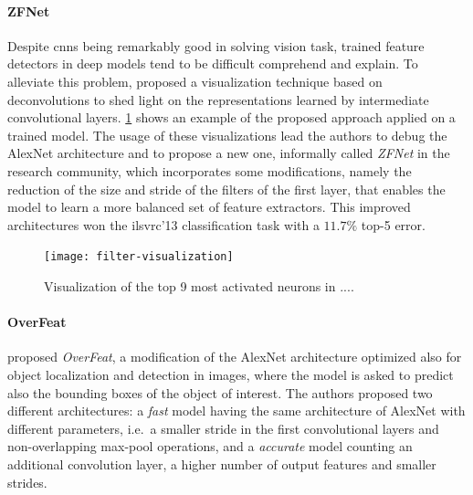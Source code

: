 \paragraph{ZFNet} Despite \glspl{cnn} being remarkably good in solving vision task,
trained feature detectors in deep models tend to be difficult comprehend and explain.
To alleviate this problem, \citet{zeiler2014visualizing} proposed a visualization technique based on deconvolutions to shed light on the representations learned by intermediate convolutional layers.
\ref{fig:back:filter-visualization} shows an example of the proposed approach applied on a trained model.
The usage of these visualizations lead the authors to debug the AlexNet architecture and to propose a new one, informally called \emph{ZFNet} in the research community, which incorporates some modifications, namely the reduction of the size and stride of the filters of the first layer, that enables the model to learn a more balanced set of feature extractors.
This improved architectures won the \gls{ilsvrc}'13 classification task with a $11.7 \%$ top-5 error.

\begin{figure}
    \centering
    \texttt{[image: filter-visualization]}
    \caption{Visualization of the top 9 most activated neurons in ....}
    \label{fig:back:filter-visualization}
\end{figure}

\paragraph{OverFeat} \citet{sermanet2013overfeat} proposed \emph{OverFeat}, a modification of the AlexNet architecture optimized also for object localization and detection in images, where the model is asked to predict also the bounding boxes of the object of interest.
The authors proposed two different architectures: a \emph{fast} model having the same architecture of AlexNet with different parameters, i.e.\ a smaller stride in the first convolutional layers and non-overlapping max-pool operations, and a \emph{accurate} model counting an additional convolution layer, a higher number of output features and smaller strides.

